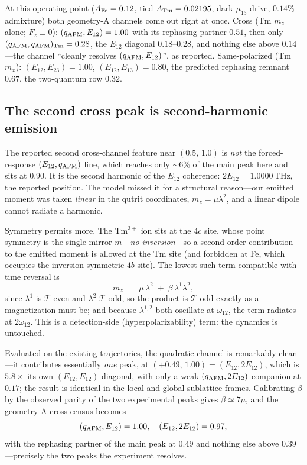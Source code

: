 \documentclass[11pt]{article}
\newcommand{\qafm}{q_{\rm AFM}}
\begin{document}
At this operating point ($A_{\rm Fe}=0.12$, tied
$A_{\rm Tm}=0.02195$, dark-$\mu_{13}$ drive, $0.14\%$ admixture) both
geometry-A channels come out right at once.  Cross (Tm $m_z$ alone;
$F_z\equiv0$): $(\qafm,E_{12})=1.00$ with its rephasing partner
$0.51$, then only $(\qafm,\qafm)_{\rm Tm}=0.28$, the $E_{12}$ diagonal
$0.18$--$0.28$, and nothing else above $0.14$---the channel
``cleanly resolves $(\qafm,E_{12})$'', as reported.  Same-polarized
(Tm $m_x$): $(E_{12},E_{23})=1.00$, $(E_{12},E_{13})=0.80$, the
predicted rephasing remnant $0.67$, the two-quantum row $0.32$.

\subsection*{The second cross peak is second-harmonic emission}
The reported second cross-channel feature near $(0.5,\,1.0)$ is
\emph{not} the forced-response $(E_{12},\qafm)$ line, which reaches only
$\sim6\%$ of the main peak here and sits at $0.90$.  It is the
second harmonic of the $E_{12}$ coherence: $2E_{12}=1.0000$\,THz, the
reported position.  The model missed it for a structural reason---our
emitted moment was taken \emph{linear} in the qutrit coordinates,
$m_z=\mu\lambda^2$, and a linear dipole cannot radiate a harmonic.

Symmetry permits more.  The Tm$^{3+}$ ion sits at the $4c$ site, whose
point symmetry is the single mirror $m$---\emph{no inversion}---so a
second-order contribution to the emitted moment is allowed at the Tm
site (and forbidden at Fe, which occupies the inversion-symmetric $4b$
site).  The lowest such term compatible with time reversal is
\begin{equation}
  m_z \;=\; \mu\,\lambda^2 \;+\; \beta\,\lambda^1\lambda^2 ,
  \label{eq:shg}
\end{equation}
since $\lambda^1$ is $\mathcal T$-even and $\lambda^2$ $\mathcal T$-odd,
so the product is $\mathcal T$-odd exactly as a magnetization must be;
and because $\lambda^{1,2}$ both oscillate at $\omega_{12}$, the term
radiates at $2\omega_{12}$.  This is a detection-side (hyperpolarizability)
term: the dynamics is untouched.

Evaluated on the existing trajectories, the quadratic channel is
remarkably clean---it contributes essentially \emph{one} peak, at
$(+0.49,\,1.00)=(E_{12},2E_{12})$, which is $5.8\times$ its own
$(E_{12},E_{12})$ diagonal, with only a weak $(\qafm,2E_{12})$
companion at $0.17$; the result is identical in the local and global
sublattice frames.  Calibrating $\beta$ by the observed parity of the
two experimental peaks gives $\beta\simeq7\mu$, and the geometry-A
cross census becomes
\[
(\qafm,E_{12})=1.00,\quad (E_{12},2E_{12})=0.97,
\]
with the rephasing partner of the main peak at $0.49$ and nothing else
above $0.39$---precisely the two peaks the experiment resolves.
\end{document}
